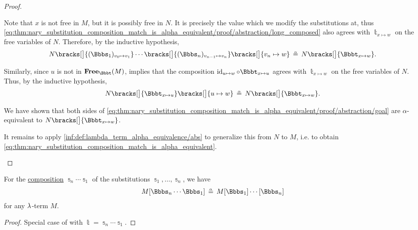 \begin{proof}
\begin{itemize}
    Note that \( x \) is not free in \( M \), but it is possibly free in \( N \). It is precisely the value which we modify the substitutions at, thus \eqref{eq:thm:nary_substitution_composition_match_is_alpha_equivalent/proof/abstraction/long_composed} also agrees with \( \Bbbt_{x \mapsto w} \) on the free variables of \( N \). Therefore, by the inductive hypothesis,
    \begin{equation*}
      N\bracks[\big]{ (\Bbbs_1)_{v_0 \mapsto v_1} } \cdots \bracks[\big]{ (\Bbbs_n)_{v_{n-1} \mapsto v_n} } \bracks[\big]{ v_n \mapsto w }
      \aequiv
      N\bracks[\big]{ \Bbbt_{x \mapsto w} }.
    \end{equation*}

    Similarly, since \( u \) is not in \( \op*{Free}_\Bbbt(M) \),  implies that the composition \( \id_{u \mapsto w} \bincirc \Bbbt_{x \mapsto u} \) agrees with \( \Bbbt_{x \mapsto w} \) on the free variables of \( N \). Thus, by the inductive hypothesis,
    \begin{equation*}
      N\bracks[\big]{ \Bbbt_{x \mapsto u} }\bracks[\big]{ u \mapsto w }
      \aequiv
      N\bracks[\big]{ \Bbbt_{x \mapsto w} }.
    \end{equation*}

    We have shown that both sides of \eqref{eq:thm:nary_substitution_composition_match_is_alpha_equivalent/proof/abstraction/goal} are \( \alpha \)-equivalent to \( N\bracks[\big]{ \Bbbt_{x \mapsto w} } \).

    It remains to apply \ref{inf:def:lambda_term_alpha_equivalence/abs} to generalize this from \( N \) to \( M \), i.e. to obtain \eqref{eq:thm:nary_substitution_composition_match_is_alpha_equivalent}.
  \end{itemize}
\end{proof}

\begin{corollary}\label{thm:nary_substitution_composition_is_alpha_equivalent}
  For the \hyperref[def:lambda_substitution_composition]{composition} \( \Bbbs_n \cdots \Bbbs_1 \) of the substitutions \( \Bbbs_1, \ldots, \Bbbs_n \), we have
  \begin{equation}\label{eq:thm:nary_substitution_composition_is_alpha_equivalent}
    M[\Bbbs_n \cdots \Bbbs_1] \aequiv M[\Bbbs_1] \cdots [\Bbbs_n]
  \end{equation}
  for any \( {\mathrm \lambda} \)-term \( M \).
\end{corollary}
\begin{proof}
  Special case of  with \( \Bbbt = \Bbbs_n \cdots \Bbbs_1 \).
\end{proof}

